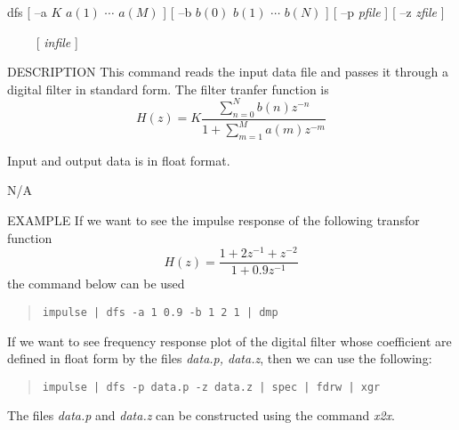 
\begin{synopsis}
\item[dfs] [ --a $K$ $a(1)$ $\cdots$ $a(M)$ ] 
	   [ --b $b(0)$ $b(1)$ $\cdots$ $b(N)$ ] 
	   [ --p {\em pfile} ] [ --z {\em zfile} ]
\item[\ ~~~] [ {\em infile} ]
\end{synopsis}

\begin{qsection}{DESCRIPTION}
 This command reads the input data file and passes it through a
  digital filter in standard form.
  The filter tranfer function is
\begin{displaymath}
  H(z)=K\frac{\displaystyle{\sum_{n=0}^{N}{b(n)z^{-n}}}}{1+\displaystyle{\sum_{m=1}^{M}{a(m)z^{-m}}}}
\end{displaymath}
\par
Input and output data is in float format.
\end{qsection}

\begin{options}
		{N/A}
\end{options}

\begin{qsection}{EXAMPLE}
If we want to see the impulse response of the following transfor
 function
\begin{displaymath}
  H(z)=\frac{1+2z^{-1}+z^{-2}}{1+0.9z^{-1}}
\end{displaymath}
the command below can be used
\begin{quote}
 \verb!impulse | dfs -a 1 0.9 -b 1 2 1 | dmp!
\end{quote}
\par
If we want to see frequency response plot of the digital filter
whose coefficient are defined in float form by the files
{\em data.p, data.z}, then we can use the following:
\begin{quote}
 \verb!impulse | dfs -p data.p -z data.z | spec | fdrw | xgr!
\end{quote}
The files {\em data.p} and {\em data.z} can be constructed
using the command {\em x2x}.
\end{qsection}
